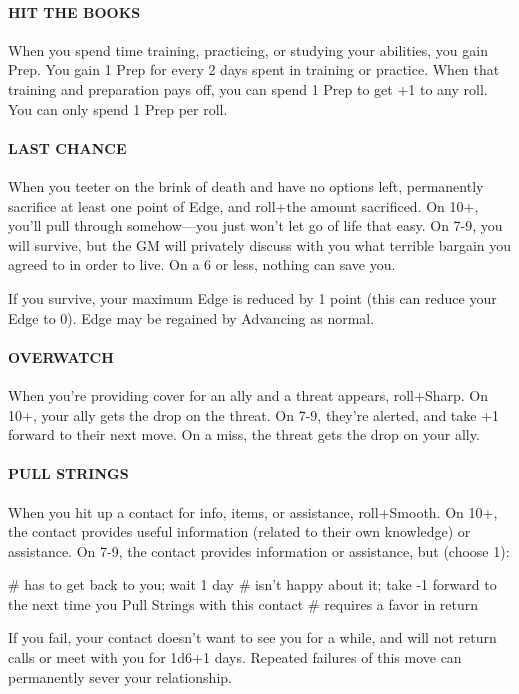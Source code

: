 \paragraph{HIT THE BOOKS}
When you spend time training, practicing, or studying your abilities, you gain Prep. You gain 1 Prep for every 2 days spent in training or practice. When that training and preparation pays off, you can spend 1 Prep to get +1 to any roll. You can only spend 1 Prep per roll.

\paragraph{LAST CHANCE}
When you teeter on the brink of death and have no options left, permanently sacrifice at least one point of Edge, and roll+the amount sacrificed. On 10+, you’ll pull through somehow—you just won’t let go of life that easy. On 7-9, you will survive, but the GM will privately discuss with you what terrible bargain you agreed to in order to live. On a 6 or less, nothing can save you.

If you survive, your maximum Edge is reduced by 1 point (this can reduce your Edge to 0). Edge may be regained by Advancing as normal.

\paragraph{OVERWATCH}
When you’re providing cover for an ally and a threat appears, roll+Sharp. On 10+, your ally gets the drop on the threat. On 7-9, they’re alerted, and take +1 forward to their next move. On a miss, the threat gets the drop on your ally.

\paragraph{PULL STRINGS}
When you hit up a contact for info, items, or assistance, roll+Smooth. On 10+, the contact provides useful information (related to their own knowledge) or assistance. On 7-9, the contact provides information or assistance, but (choose 1):
\begin{easylist}
    # has to get back to you; wait 1 day
    # isn’t happy about it; take -1 forward to the next time you Pull Strings with this contact
    # requires a favor in return
\end{easylist}
If you fail, your contact doesn’t want to see you for a while, and will not return calls or meet with you for 1d6+1 days. Repeated failures of this move can permanently sever your relationship.

